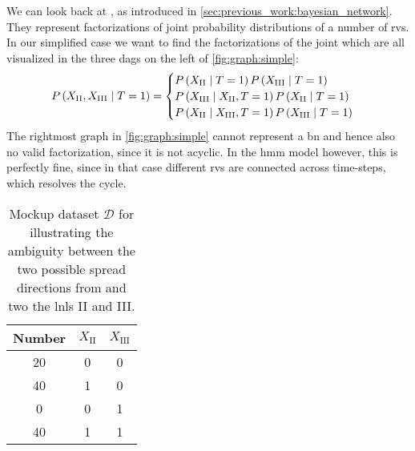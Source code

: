 \documentclass[\relativeRoot/main.tex]{subfiles}
\begin{document}
We can look back at , as introduced in \cref{sec:previous_work:bayesian_network}. They represent factorizations of joint probability distributions of a number of \glspl{rv}. In our simplified case we want to find the factorizations of the joint which are all visualized in the three \glspl{dag} on the left of \cref{fig:graph:simple}:
%
\begin{equation}
    P \left( X_\text{II}, X_\text{III} \mid T=1 \right) = \begin{cases}
        P \left( X_\text{II} \mid T=1 \right) P \left( X_\text{III} \mid T=1 \right) \\
        P \left( X_\text{III} \mid X_\text{II}, T=1 \right) P \left( X_\text{II} \mid T=1 \right) \\
        P \left( X_\text{II} \mid X_\text{III}, T=1 \right) P \left( X_\text{III} \mid T=1 \right)
    \end{cases}
\end{equation}
%
The rightmost graph in \cref{fig:graph:simple} cannot represent a \gls{bn} and hence also no valid factorization, since it is not acyclic. In the \gls{hmm} model however, this is perfectly fine, since in that case different \glspl{rv} are connected across time-steps, which resolves the cycle.

\begin{table}
    \centering
    \begin{tabular}{|c|cc|}
        \hline
        Number & $X_\text{II}$ & $X_\text{III}$ \\
        \hline
        20 & 0 & 0 \\
        40 & 1 & 0 \\
         0 & 0 & 1 \\
        40 & 1 & 1 \\
        \hline
    \end{tabular}
    \caption{Mockup dataset $\boldsymbol{\mathcal{D}}$ for illustrating the ambiguity between the two possible spread directions from and two the \glspl{lnl} II and III.}
    \label{table:graph:simple:mockup}
\end{table}
\end{document}
